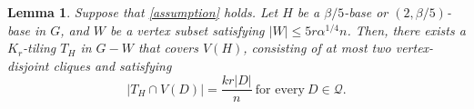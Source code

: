 \documentclass[11pt, a4paper]{article}
\newtheorem{lemma}[theorem]{Lemma}
\theoremstyle{definition}
\newcommand{\<}{\subseteq}
\begin{document}
\begin{lemma}\label{extend}
Suppose that \ref{assumption} holds. Let $H$ be a $\beta/5$-base or $(2,\beta/5)$-base in $G$, and $W$ be a vertex subset satisfying $|W| \leq 5r\alpha^{1/4}n$. Then, there exists a $K_r$-tiling ${T}_H$ in $G-W$ that covers $V(H)$, consisting of at most two vertex-disjoint cliques and  satisfying 
\[
|T_H \cap V(D)| = \frac{kr|D|}{n}\ \text{for every}\ D\in \mathcal{Q}.
\]
\end{lemma}
\end{document}
